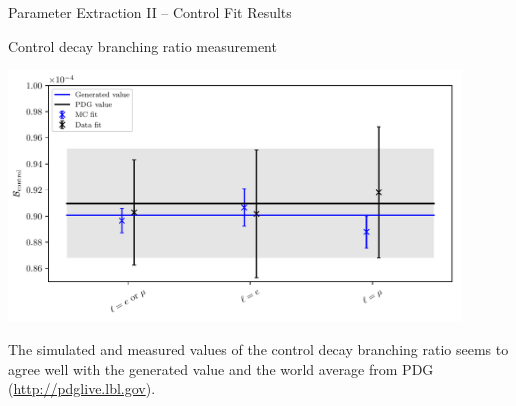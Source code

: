 \documentclass[serif]{beamer}
\begin{document}

\begin{frame}[t]{Parameter Extraction II -- Control Fit Results}
\vspace{-3mm}
\small

Control decay branching ratio measurement
\vspace{-2mm}
\begin{center}
	\includegraphics[width=0.9\textwidth]{fig/br_plot}
\end{center}
\vspace{-2mm}
\textcolor{turtlegreen}{The simulated and measured values of the control decay branching ratio seems to agree well with the generated value and the world average from PDG (\url{http://pdglive.lbl.gov}).}

\end{frame}

\end{document}
